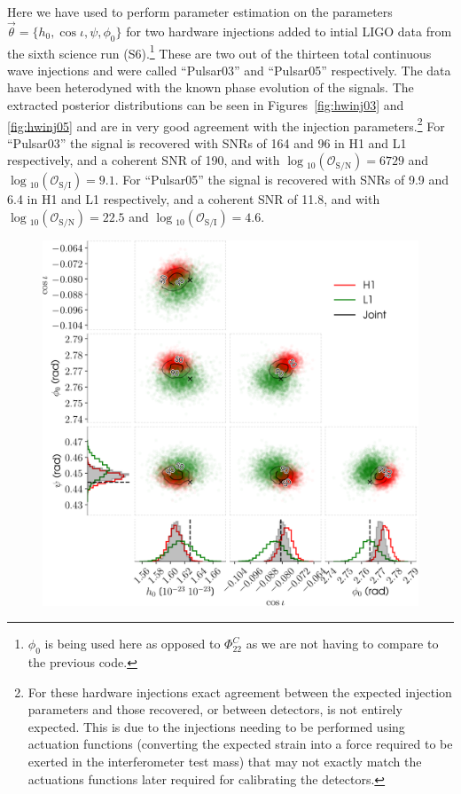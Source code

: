 Here we have used \lppen to perform parameter estimation on the parameters $\vec{\theta} = \{h_0, \cos{\iota}, \psi, \phi_{0}\}$ for two hardware injections added
to intial LIGO data from the sixth science run (S6).\footnote{$\phi_0$ is being used here as opposed to $\Phi_{22}^C$ as we are not having to compare to the previous
code.} These are two out of the thirteen total continuous wave injections and were called ``Pulsar03'' and ``Pulsar05''
respectively. The data have been heterodyned with the known phase evolution of the signals. The extracted posterior distributions can be seen in
Figures~\ref{fig:hwinj03} and \ref{fig:hwinj05} and are in very good agreement with the injection parameters.\footnote{For these hardware injections
exact agreement between the expected injection parameters and those recovered, or between detectors, is not entirely expected. This is due to the
injections needing to be performed using actuation functions (converting the expected \gw strain into a force required to be exerted in the
interferometer test mass) that may not exactly match the actuations functions later required for calibrating the detectors.} For ``Pulsar03''
the signal is recovered with SNRs of 164 and 96 in H1 and L1 respectively, and a coherent SNR of 190, and with
$\log{}_{10}\left(\mathcal{O}_{\text{S}/\text{N}}\right) = 6729$ and $\log{}_{10}\left(\mathcal{O}_{\text{S}/\text{I}}\right) = 9.1$. For ``Pulsar05''
the signal is recovered with SNRs of 9.9 and 6.4 in H1 and L1 respectively, and a coherent SNR of 11.8, and with
$\log{}_{10}\left(\mathcal{O}_{\text{S}/\text{N}}\right) = 22.5$ and $\log{}_{10}\left(\mathcal{O}_{\text{S}/\text{I}}\right) = 4.6$.

\begin{figure}[!phtb]
\begin{center}
\includegraphics[width=1\columnwidth]{./figures/codeeval/simulations/S6_hwinj/hwinj03/hwinj03}
\caption{ \protect}
\end{center}
\end{figure}

